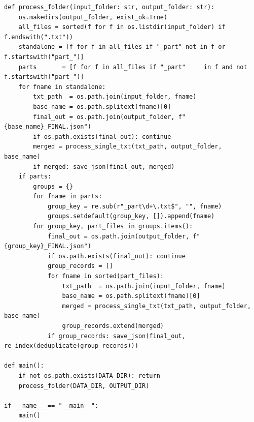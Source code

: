 \documentclass[11pt]{article}
\begin{document}
\begin{lstlisting}[style=pythonstyle, caption={generate\_dataset\_first.py}]
def process_folder(input_folder: str, output_folder: str):
    os.makedirs(output_folder, exist_ok=True)
    all_files = sorted(f for f in os.listdir(input_folder) if f.endswith(".txt"))
    standalone = [f for f in all_files if "_part" not in f or f.startswith("part_")]
    parts       = [f for f in all_files if "_part"     in f and not f.startswith("part_")]
    for fname in standalone:
        txt_path  = os.path.join(input_folder, fname)
        base_name = os.path.splitext(fname)[0]
        final_out = os.path.join(output_folder, f"{base_name}_FINAL.json")
        if os.path.exists(final_out): continue
        merged = process_single_txt(txt_path, output_folder, base_name)
        if merged: save_json(final_out, merged)
    if parts:
        groups = {}
        for fname in parts:
            group_key = re.sub(r"_part\d+\.txt$", "", fname)
            groups.setdefault(group_key, []).append(fname)
        for group_key, part_files in groups.items():
            final_out = os.path.join(output_folder, f"{group_key}_FINAL.json")
            if os.path.exists(final_out): continue
            group_records = []
            for fname in sorted(part_files):
                txt_path  = os.path.join(input_folder, fname)
                base_name = os.path.splitext(fname)[0]
                merged = process_single_txt(txt_path, output_folder, base_name)
                group_records.extend(merged)
            if group_records: save_json(final_out, re_index(deduplicate(group_records)))

def main():
    if not os.path.exists(DATA_DIR): return
    process_folder(DATA_DIR, OUTPUT_DIR)

if __name__ == "__main__":
    main()
\end{lstlisting}

\newpage
\end{document}
